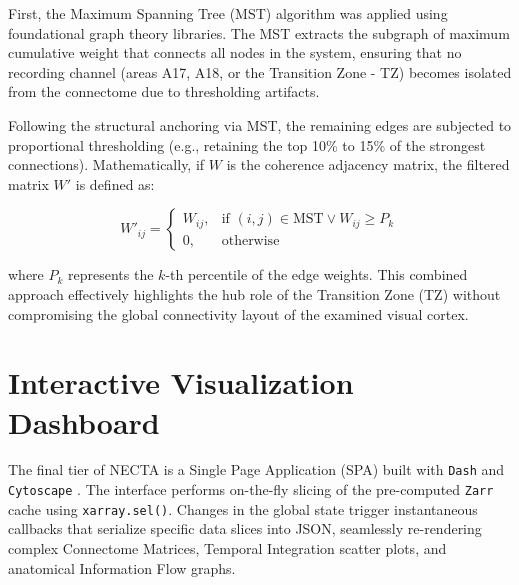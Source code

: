 First, the Maximum Spanning Tree (MST) algorithm was applied using foundational graph theory libraries. The MST extracts the subgraph of maximum cumulative weight that connects all nodes in the system, ensuring that no recording channel (areas A17, A18, or the Transition Zone - TZ) becomes isolated from the connectome due to thresholding artifacts.

Following the structural anchoring via MST, the remaining edges are subjected to proportional thresholding (e.g., retaining the top 10\% to 15\% of the strongest connections). Mathematically, if $W$ is the coherence adjacency matrix, the filtered matrix $W'$ is defined as:

\begin{equation}
W'_{ij} = 
\begin{cases} 
W_{ij}, & \text{if } (i,j) \in \text{MST} \lor W_{ij} \geq P_{k} \\
0, & \text{otherwise}
\end{cases}
\end{equation}

where $P_{k}$ represents the $k$-th percentile of the edge weights. This combined approach effectively highlights the hub role of the Transition Zone (TZ) without compromising the global connectivity layout of the examined visual cortex.

\section{Interactive Visualization Dashboard}
The final tier of NECTA is a Single Page Application (SPA) built with \texttt{Dash} \cite{plotly2015} and \texttt{Cytoscape} \cite{shannon2003cytoscape}. The interface performs on-the-fly slicing of the pre-computed \texttt{Zarr} cache using \texttt{xarray.sel()}. Changes in the global state trigger instantaneous callbacks that serialize specific data slices into JSON, seamlessly re-rendering complex Connectome Matrices, Temporal Integration scatter plots, and anatomical Information Flow graphs.
